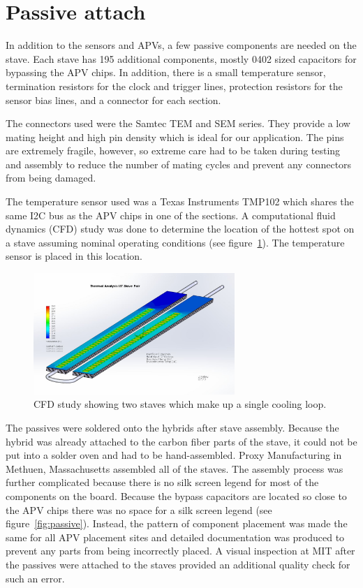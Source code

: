 \documentclass[preprint,12pt]{elsarticle}
\begin{document}
\section{Passive attach}
In addition to the sensors and APVs, a few passive components are needed on the stave.
Each stave has 195 additional components, mostly 0402 sized capacitors for
bypassing the APV chips. In addition, there is a small temperature sensor,
termination resistors for the clock and trigger lines, protection resistors for
the sensor bias lines, and a connector for each section.

The connectors used were the Samtec TEM and SEM series. They provide a low
mating height and high pin density which is ideal for our application. The
pins are extremely fragile, however, so extreme care had to be taken during
testing and assembly to reduce the number of mating cycles and prevent any
connectors from being damaged.

The temperature sensor used was a Texas Instruments TMP102 which shares the same
I2C bus as the APV chips in one of the sections. A computational fluid dynamics (CFD) study was done to
determine the location of the hottest spot on a stave assuming nominal operating
conditions (see figure~\ref{fig:cfd}). The temperature sensor is placed in this location.

\begin{figure}[ht]
\begin{center}
\includegraphics[width=3in, keepaspectratio=true, angle=0]{graphics/cfd.jpg}
\caption{CFD study showing two staves which make up a single cooling loop.
\label{fig:cfd}}
\end{center}
\end{figure}
%
The passives were soldered onto the hybrids after stave assembly. Because the
hybrid was already attached to the carbon fiber parts of the stave, it
could not be put into a solder oven and had to be hand-assembled. Proxy
Manufacturing in Methuen, Massachusetts assembled all of the staves. The
assembly process was further complicated because there is no silk screen
legend for most of the components on the board. Because the bypass capacitors
are located so close to the APV chips there was no space for a silk screen
legend (see figure~\ref{fig:passive}). Instead, the pattern of component placement was made the same for all
APV placement sites and detailed documentation was produced to prevent any parts
from being incorrectly placed. A visual inspection at MIT after the
passives were attached to the staves provided an additional quality check for
such an error.
\end{document}
